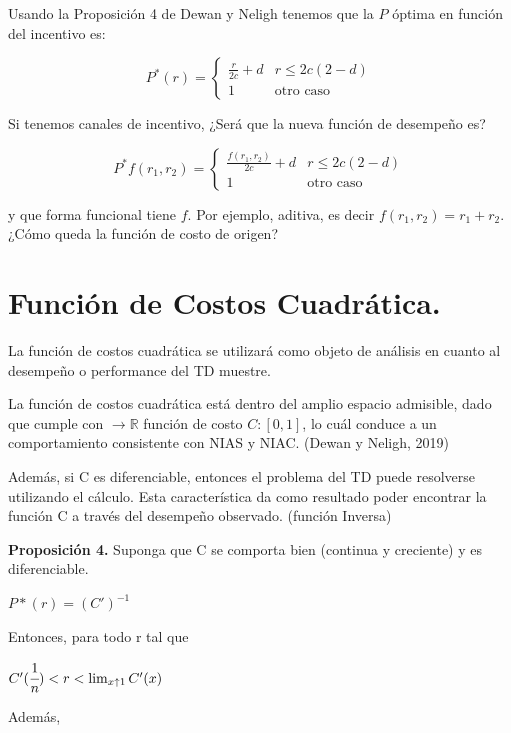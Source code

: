 \documentclass[11pt,letterpaper]{article}
\begin{document}
Usando la Proposición 4 de Dewan y Neligh tenemos que la $P$ óptima en función del incentivo es:

$$P^*(r)=\begin{cases}\frac{r}{2c}+d& r\leq 2c(2-d)\\ 1&\text{otro caso}\end{cases}$$

Si tenemos canales de incentivo, ¿Será que la nueva función de desempeño es?

$$P^*f(r_1,r_2)=\begin{cases}\frac{f(r_1,r_2)}{2c}+d& r\leq 2c(2-d)\\ 1&\text{otro caso}\end{cases}$$

y que forma funcional tiene $f$. Por ejemplo, aditiva, es decir $f(r_1,r_2)=r_1+r_2$. ¿Cómo queda la función de costo de origen?


\section{Función de Costos Cuadrática.}

La función de costos cuadrática se utilizará como objeto de análisis en cuanto al desempeño o performance del TD muestre. 

La función de costos cuadrática está dentro del amplio espacio admisible, dado que cumple con $\longrightarrow \mathbb R$ función de costo $C:[0,1]$, lo cuál conduce a un comportamiento consistente con NIAS y NIAC. (Dewan y Neligh, 2019)

Además, si C es diferenciable, entonces el problema del TD puede resolverse utilizando el cálculo. Esta característica da como resultado poder encontrar la función C a través del desempeño observado. (función Inversa)

\vspace{0,5cm}

\textbf{Proposición 4.} Suponga que C se comporta bien (continua y creciente) y es diferenciable.

\begin{center}
    $P*(r) = (C')^{-1}$ 
\end{center}

Entonces, para todo r tal que

\begin{center}
    $C'(\cfrac{1}{n})<r<\lim_{x\uparrow1} C'(x)$
\end{center}

Además,
\end{document}
